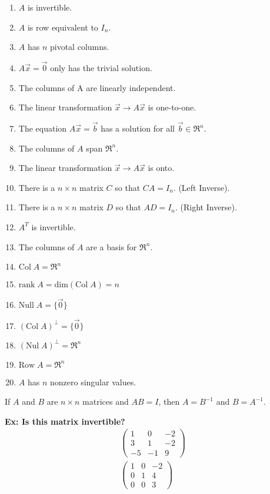 \begin{enumerate}
    \item \(A\) is invertible.
    \item \(A\) is row equivalent to \(I_n\).
    \item \(A\) has \(n\) pivotal columns.
    \item \(A \vec{x} = \Vec{0}\) only has the trivial solution.
    \item The columns of A are linearly independent.
    \item The linear transformation \(\Vec{x} \rightarrow A \Vec{x}\) is one-to-one.
    \item The equation \(A \Vec{x} = \Vec{b}\) has a solution for all \(\Vec{b}\in \Re^n\).
    \item The columns of \(A\) span \(\Re^n\).
    \item The linear transformation \(\Vec{x} \rightarrow A \Vec{x}\) is onto.
    \item There is a \(n \times n\) matrix \(C\) so that \(C A = I_n\). (Left Inverse).
    \item There is a \(n \times n\) matrix \(D\) so that \(A D = I_n\). (Right Inverse).
    \item \(A^T\) is invertible.
    \item The columns of \(A\) are a basis for \(\Re^n\).
    \item \(\text{Col} \; A = \Re^n\)
    \item \(\text{rank} \; A = \text{dim}(\text{Col} \; A) = n\)
    \item \(\text{Null} \; A = \{\Vec{0}\}\)
    \item \((\text{Col} \; A)^\perp = \{\Vec{0}\}\)
    \item \((\text{Nul} \; A)^\perp = \Re^n\)
    \item \(\text{Row} \; A = \Re^n\)
    \item \(A\) has \(n\) nonzero singular values.
\end{enumerate}

\begin{theorem}
    If \(A\) and \(B\) are \(n \times n\) matrices and \(A B = I\), then \(A = B^{-1}\) and \(B = A^{-1}\).
\end{theorem}

\noindent
\newline
\textbf{Ex: Is this matrix invertible?}
\begin{align}
    \begin{pmatrix}
        1 & 0 & -2 \\
        3 & 1 & -2 \\
        -5 & -1 & 9
    \end{pmatrix} \\
    \begin{pmatrix}
        1 & 0 & -2 \\
        0 & 1 & 4 \\
        0 & 0 & 3
    \end{pmatrix}
\end{align}

